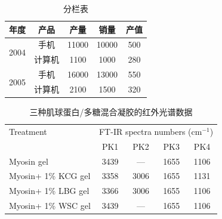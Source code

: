 \begin{table}[!htb]
\centering
\caption{分栏表}
\begin{tabular}{ccccc}
\hline
年度                    & 产品  & 产量    & 销量    & 产值  \\ \hline
\multirow{2}{*}{2004} & 手机  & 11000 & 10000 & 500 \\
                      & 计算机 & 1100  & 1000  & 280 \\ \hline
\multirow{2}{*}{2005} & 手机  & 16000 & 13000 & 550 \\
                      & 计算机 & 2100  & 1500  & 320 \\ \hline
\end{tabular}
\end{table}





\begin{table}[!htb]
    \centering
    \caption{三种肌球蛋白/多糖混合凝胶的红外光谱数据}
    \begin{tabular}{lcccc}
    \hline
    Treatment           & \multicolumn{4}{c}{FT-IR spectra numbers (cm$^{−1}$)} \\ \cline{2-5} 
                        & PK1        & PK2        & PK3        & PK4       \\ \hline
    Myosin gel          & 3439       & —          & 1655       & 1106      \\
    Myosin+ 1\% KCG gel & 3358       & 3006       & 1655       & 1131      \\
    Myosin+ 1\% LBG gel & 3366       & 3006       & 1655       & 1106      \\
    Myosin+ 1\% WSC gel & 3439       & —          & 1655       & 1106      \\ \hline
    \end{tabular}
    \end{table}